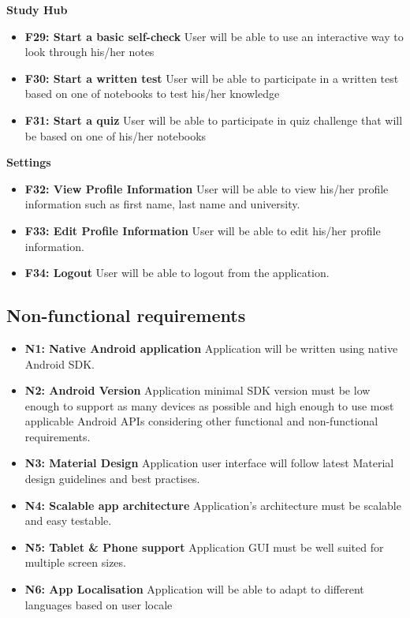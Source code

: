 \documentclass[thesis=B,english]{FITthesis}[2012/10/20]
\begin{document}
\bigskip
\textbf{Study Hub}
\begin{itemize}
	\item \textbf{F29: Start a basic self-check} User will be able to use an interactive way to look through his/her notes
	\item \textbf{F30: Start a written test} User will be able to participate in a written test based on one of notebooks to test his/her knowledge
	\item \textbf{F31: Start a quiz} User will be able to participate in quiz challenge that will be based on one of his/her notebooks
	
\end{itemize}


\bigskip
\textbf{Settings}
\begin{itemize}
	\item \textbf{F32: View Profile Information} User will be able to view his/her profile information such as first name, last name and  university.
	\item \textbf{F33: Edit Profile Information} User will be able to edit his/her profile information.
	\item \textbf{F34: Logout} User will be able to logout from the application.
\end{itemize}


\subsection{Non-functional requirements}

\begin{itemize}
  \item \textbf{N1: Native Android application}  Application will be written using native Android SDK.
  \item \textbf{N2: Android Version} Application minimal SDK version must be low enough to support as many devices as possible and high enough to use most applicable  Android APIs considering other functional and non-functional requirements.
  \item \textbf{N3: Material Design} Application user interface will follow latest Material design guidelines and best practises.
  \item \textbf{N4: Scalable app architecture} Application's architecture must be scalable and easy testable.
  \item \textbf{N5: Tablet \& Phone support} Application GUI must be well suited for multiple screen sizes.
  \item \textbf{N6: App Localisation} Application will be able to adapt to different languages based on user locale
\end{itemize}
\end{document}
